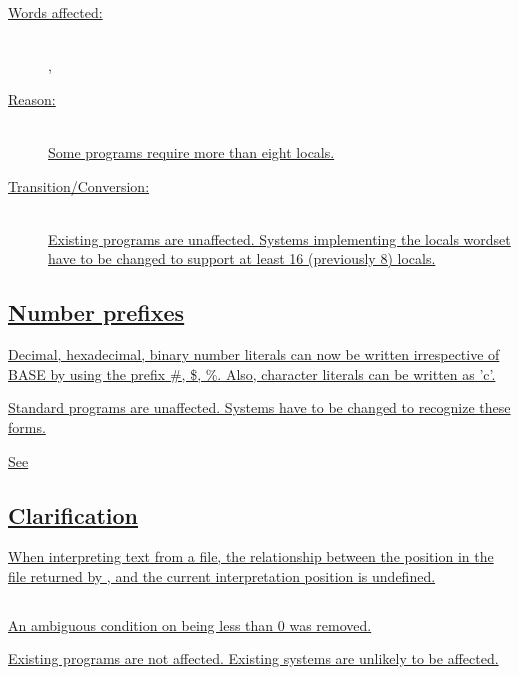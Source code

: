 \begin{description}
\item[\uline{Words affected:}] ~\\
	\uline{, }

\item[\uline{Reason:}] ~\\
	\uline{Some programs require more than eight locals.}
 
\item[\uline{Transition/Conversion:}] ~\\
	\uline{Existing programs are unaffected.  Systems implementing the locals
	wordset have to be changed to support at least 16 (previously 8) locals.}
\end{description}

\subsection[Number prefixes]{\uline{Number prefixes}}
 \label{diff:12:prefix}

\uline{Decimal, hexadecimal, binary number literals can now be written
irrespective of BASE by using the prefix \#, \$, \%.  Also, character
literals can be written as 'c'.}
 
\uline{Standard programs are unaffected.  Systems have to be changed to
recognize these forms.}

\uline{See} 
 

\subsection[SOURCE-ID Clarification]{\uline{ Clarification}}
\label{diff:12:sourceid}

\uline{%
When interpreting text from a file, the relationship between the position in the
file returned by , and the current interpretation position is
undefined.}


\subsection[FASINH]{\uline{}}
 \label{diff:12:fasinh}

\uline{An ambiguous condition on  being less than 0 was removed.}

\uline{Existing programs are not affected.  Existing systems are
unlikely to be affected.}

